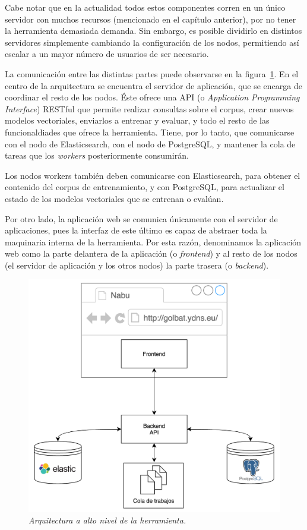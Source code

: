 Cabe notar que en la actualidad todos estos componentes corren en un único servidor con muchos
recursos (mencionado en el capítulo anterior), por no tener la herramienta demasiada demanda. Sin
embargo, es posible dividirlo en distintos servidores simplemente cambiando la configuración de los
nodos, permitiendo así escalar a un mayor número de usuarios de ser necesario.

La comunicación entre las distintas partes puede observarse en la figura~\ref{fig:diag-tool-arch}.
En el centro de la arquitectura se encuentra el servidor de aplicación, que se encarga de coordinar
el resto de los nodos. Éste ofrece una API (o \textit{Application Programming Interface}) RESTful
que permite realizar consultas sobre el corpus, crear nuevos modelos vectoriales, enviarlos a entrenar
y evaluar, y todo el resto de las funcionaldiades que ofrece la herramienta. Tiene, por lo tanto, que
comunicarse con el nodo de Elasticsearch, con el nodo de PostgreSQL, y mantener la cola de tareas
que los \textit{workers} posteriormente consumirán.

Los nodos workers también deben comunicarse con Elasticsearch, para obtener el contenido del
corpus de entrenamiento, y con PostgreSQL, para actualizar el estado de los modelos vectoriales que
se entrenan o evalúan.

Por otro lado, la aplicación web se comunica únicamente con el servidor de aplicaciones, pues la
interfaz de este último es capaz de abstraer toda la maquinaria interna de la herramienta. Por esta
razón, denominamos la aplicación web como la parte delantera de la aplicación (o \textit{frontend})
y al resto de los nodos (el servidor de aplicación y los otros nodos) la parte trasera (o
\textit{backend}).

\begin{figure}[h]
    \centering
    \includegraphics[width=\textwidth]{images/diag-tool-arch}
    \caption{\textit{Arquitectura a alto nivel de la herramienta.}}
    \label{fig:diag-tool-arch}
\end{figure}


